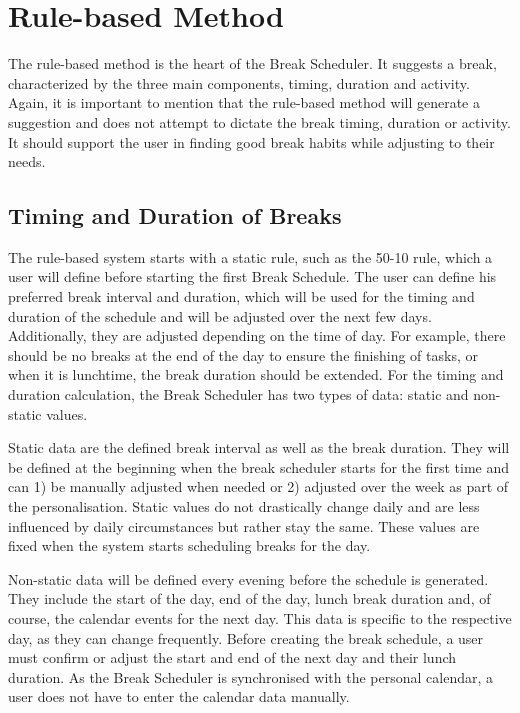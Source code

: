 \documentclass{hasel_thesis}
\begin{document}
\section{Rule-based Method}
The rule-based method is the heart of the Break Scheduler. It suggests a break, characterized by the three main components, timing, duration and activity. Again, it is important to mention that the rule-based method will generate a suggestion and does not attempt to dictate the break timing, duration or activity. It should support the user in finding good break habits while adjusting to their needs.


\subsection{Timing and Duration of Breaks}
The rule-based system starts with a static rule, such as the 50-10 rule, which a user will define before starting the first Break Schedule. The user can define his preferred break interval and duration, which will be used for the timing and duration of the schedule and will be adjusted over the next few days. Additionally, they are adjusted depending on the time of day. For example, there should be no breaks at the end of the day to ensure the finishing of tasks, or when it is lunchtime, the break duration should be extended. For the timing and duration calculation, the Break Scheduler has two types of data: static and non-static values. 

Static data are the defined break interval as well as the break duration. They will be defined at the beginning when the break scheduler starts for the first time and can 1) be manually adjusted when needed or 2) adjusted over the week as part of the personalisation. Static values do not drastically change daily and are less influenced by daily circumstances but rather stay the same. These values are fixed when the system starts scheduling breaks for the day. 

Non-static data will be defined every evening before the schedule is generated. They include the start of the day, end of the day, lunch break duration and, of course, the calendar events for the next day. This data is specific to the respective day, as they can change frequently. Before creating the break schedule, a user must confirm or adjust the start and end of the next day and their lunch duration. As the Break Scheduler is synchronised with the personal calendar, a user does not have to enter the calendar data manually.
\end{document}
